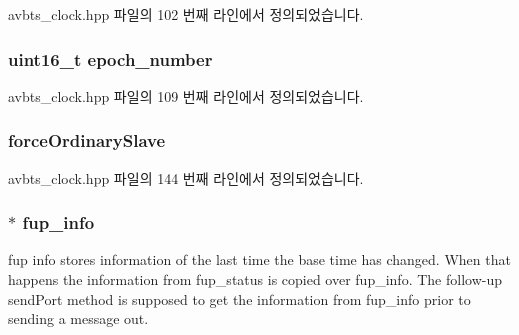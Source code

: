 avbts\+\_\+clock.\+hpp 파일의 102 번째 라인에서 정의되었습니다.

\subsubsection[{\texorpdfstring{epoch\+\_\+number}{epoch_number}}]{\setlength{\rightskip}{0pt plus 5cm}uint16\+\_\+t epoch\+\_\+number\hspace{0.3cm}{\ttfamily [private]}}\hypertarget{class_i_e_e_e1588_clock_a173a222571e06b971b91262347a350fd}{}\label{class_i_e_e_e1588_clock_a173a222571e06b971b91262347a350fd}


avbts\+\_\+clock.\+hpp 파일의 109 번째 라인에서 정의되었습니다.

\subsubsection[{\texorpdfstring{force\+Ordinary\+Slave}{forceOrdinarySlave}}]{ force\+Ordinary\+Slave\hspace{0.3cm}{\ttfamily [private]}}\hypertarget{class_i_e_e_e1588_clock_ae0c175aedaecf0e5d9b536e6f4f9dbab}{}\label{class_i_e_e_e1588_clock_ae0c175aedaecf0e5d9b536e6f4f9dbab}


avbts\+\_\+clock.\+hpp 파일의 144 번째 라인에서 정의되었습니다.

\subsubsection[{\texorpdfstring{fup\+\_\+info}{fup_info}}]{$\ast$ fup\+\_\+info\hspace{0.3cm}{\ttfamily [private]}}\hypertarget{class_i_e_e_e1588_clock_a9df8b5f3401b8f4ad34dfb75c956d008}{}\label{class_i_e_e_e1588_clock_a9df8b5f3401b8f4ad34dfb75c956d008}


fup info stores information of the last time the base time has changed. When that happens the information from fup\+\_\+status is copied over fup\+\_\+info. The follow-\/up send\+Port method is supposed to get the information from fup\+\_\+info prior to sending a message out. 




